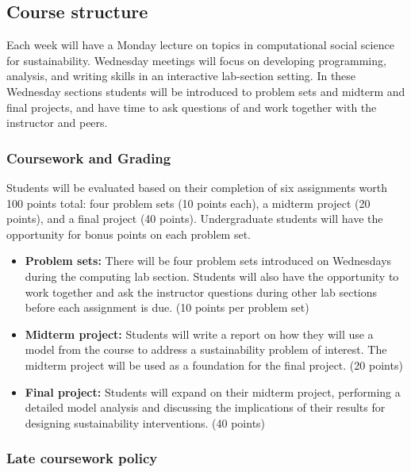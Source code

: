 \documentclass[letterpaper]{article}
\providecommand{\tightlist}{%
  \setlength{\itemsep}{0pt}\setlength{\parskip}{0pt}}
\begin{document}
\subsection{Course structure}\label{course-structure}

Each week will have a Monday lecture on topics in computational social
science for sustainability. Wednesday meetings will focus on developing
programming, analysis, and writing skills in an interactive lab-section
setting. In these Wednesday sections students will be introduced to
problem sets and midterm and final projects, and have time to ask
questions of and work together with the instructor and peers.

\subsubsection{Coursework and Grading}\label{coursework-and-grading}

Students will be evaluated based on their completion of six assignments
worth 100 points total: four problem sets (10 points each), a midterm
project (20 points), and a final project (40 points). Undergraduate
students will have the opportunity for bonus points on each problem set.

\begin{itemize}
\tightlist
\item
  \textbf{Problem sets:} There will be four problem sets introduced on
  Wednesdays during the computing lab section. Students will also have
  the opportunity to work together and ask the instructor questions
  during other lab sections before each assignment is due. (10 points
  per problem set)
\item
  \textbf{Midterm project:} Students will write a report on how they
  will use a model from the course to address a sustainability problem
  of interest. The midterm project will be used as a foundation for the
  final project. (20 points)
\item
  \textbf{Final project:} Students will expand on their midterm project,
  performing a detailed model analysis and discussing the implications
  of their results for designing sustainability interventions. (40
  points)
\end{itemize}

\subsubsection{Late coursework policy}\label{late-coursework-policy}
\end{document}
